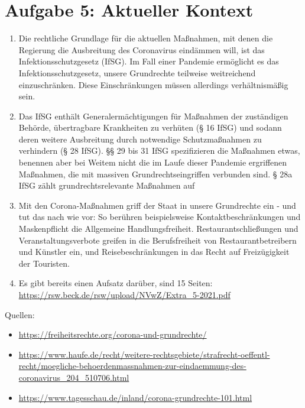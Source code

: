 \documentclass{article}
\begin{document}
	\section*{Aufgabe 5: Aktueller Kontext}
	\begin{enumerate}[label=(\alph*)]
		\item Die rechtliche Grundlage für die aktuellen Maßnahmen, mit denen die Regierung die Ausbreitung des Coronavirus eindämmen will, ist das Infektionsschutzgesetz (IfSG). Im Fall einer Pandemie ermöglicht es das Infektionsschutzgesetz, unsere Grundrechte teilweise weitreichend einzuschränken. Diese Einschränkungen müssen allerdings verhältnismäßig sein.
		\item Das IfSG enthält Generalermächtigungen für Maßnahmen der zuständigen Behörde, übertragbare Krankheiten zu verhüten (§ 16 IfSG) und sodann deren weitere Ausbreitung durch notwendige Schutzmaßnahmen zu verhindern (§ 28 IfSG).  §§ 29 bis 31 IfSG spezifizieren die Maßnahmen etwas, benennen aber bei Weitem nicht die im Laufe dieser Pandemie ergriffenen Maßnahmen, die mit massiven Grundrechtseingriffen verbunden sind. § 28a IfSG zählt grundrechtsrelevante Maßnahmen auf
		\item Mit den Corona-Maßnahmen griff der Staat in unsere Grundrechte ein - und tut das nach wie vor: So berühren beispielsweise Kontaktbeschränkungen und Maskenpflicht die Allgemeine Handlungsfreiheit. Restaurantschließungen und Veranstaltungsverbote greifen in die Berufsfreiheit von Restaurantbetreibern und Künstler ein, und Reisebeschränkungen in das Recht auf Freizügigkeit der Touristen.
		\item Es gibt bereits einen Aufsatz darüber, sind 15 Seiten: \url{https://rsw.beck.de/rsw/upload/NVwZ/Extra_5-2021.pdf}
	\end{enumerate}

	Quellen:
	\begin{itemize}
		\item \url{https://freiheitsrechte.org/corona-und-grundrechte/}
		\item \url{https://www.haufe.de/recht/weitere-rechtsgebiete/strafrecht-oeffentl-recht/moegliche-behoerdenmassnahmen-zur-eindaemmung-des-coronavirus_204_510706.html}
		\item \url{https://www.tagesschau.de/inland/corona-grundrechte-101.html}
	\end{itemize}
	
\end{document}
